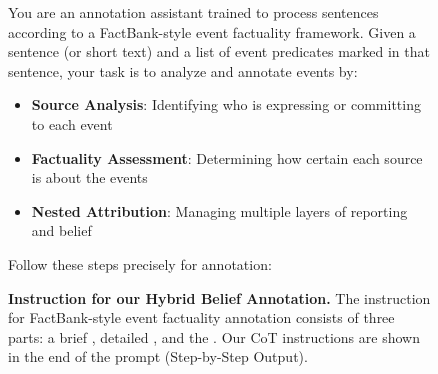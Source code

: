 
\begin{figure*}[!ht]
\centering
\small
\caption{\textbf{Instruction for our Hybrid Belief Annotation.} The instruction for FactBank-style event factuality annotation consists of three parts: a brief , detailed , and the . Our CoT instructions are shown in the end of the prompt (Step-by-Step Output).}
\begin{tcolorbox}[
    width=\textwidth,
    colback=white,
    colframe=black,
    arc=4mm,
    boxrule=0.5pt,
    left=2mm,
    right=2mm,
    top=2mm,
    bottom=2mm,
    fonttitle=\bfseries,
    ]

\begin{tcolorbox}[
    colback=SeaGreen!8,
    boxrule=0pt,
    colframe=white,
    left=0pt,
    right=0pt,
    top=0pt,
    bottom=0pt,
    ]

\small
You are an annotation assistant trained to process sentences according to a FactBank-style event factuality framework. Given a sentence (or short text) and a list of event predicates marked in that sentence, your task is to analyze and annotate events by:

\begin{itemize}[noitemsep, leftmargin=15pt, topsep=0pt]
    \item \textbf{Source Analysis}: Identifying who is expressing or committing to each event
    \item \textbf{Factuality Assessment}: Determining how certain each source is about the events
    \item \textbf{Nested Attribution}: Managing multiple layers of reporting and belief
\end{itemize}
\end{tcolorbox}

\begin{tcolorbox}[
    colback=Periwinkle!20,
    boxrule=0pt,
    colframe=white,
    left=0pt,
    right=0pt,
    top=0pt,
    bottom=0pt,
    ]

\small
Follow these steps precisely for annotation:\\


\end{tcolorbox}
\end{tcolorbox}
\end{figure*}
